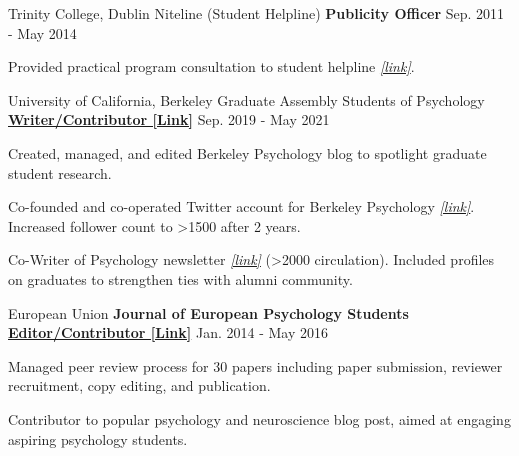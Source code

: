 \begin{cventries}
  \cventry
  	{Trinity College, Dublin}
  	{Niteline (Student Helpline)} %
    {\textbf{Publicity Officer}} %
    {Sep. 2011 - May 2014} %
    {
      \begin{cvitems} %
        \item {Provided practical program consultation to student helpline \href{https://niteline.ie/}{\textit{[link]}}.}
      \end{cvitems}
    }


  \cventry 
    {University of California, Berkeley} %
    {Graduate Assembly Students of Psychology}
    {\href{https://psychblog.berkeley.edu/opinion/2019/09/09/Graduate-School-Advice/}{\textbf{Writer/Contributor [Link]}}} %
    {Sep. 2019 - May 2021} %
    {
      \begin{cvitems} 
      	\item {Created, managed, and edited Berkeley Psychology blog to spotlight graduate student research.}
      	\item {Co-founded and co-operated Twitter account for Berkeley Psychology \href{https://twitter.com/BerkeleyPsych}{\textit{[link]}}. Increased follower count to >1500 after 2 years.}
      	\item {Co-Writer of Psychology newsletter \href{https://psychology.berkeley.edu/sites/default/files/newsletters/2021spr_fullnewsletter_v2.pdf}{\textit{[link]}} (>2000 circulation). Included profiles on graduates to strengthen ties with alumni community.}
      \end{cvitems}
    }
    
\begin{cventries}

  \cventry
    {European Union}
    {\textbf{Journal of European Psychology Students}} %
    {\href{https://blog.efpsa.org/2015/09/22/editors-pick-our-favourite-psychology-and-neuroscience-podcasts}{\textbf{Editor/Contributor [Link]}}} %
    {Jan. 2014 - May 2016} %
    {
      \begin{cvitems} %
      	\item {Managed peer review process for 30 papers including paper submission, reviewer recruitment, copy editing, and publication.}
        \item {Contributor to popular psychology and neuroscience blog post, aimed at engaging aspiring psychology students.}
      \end{cvitems}
    }


\end{cventries}
\end{cventries}
